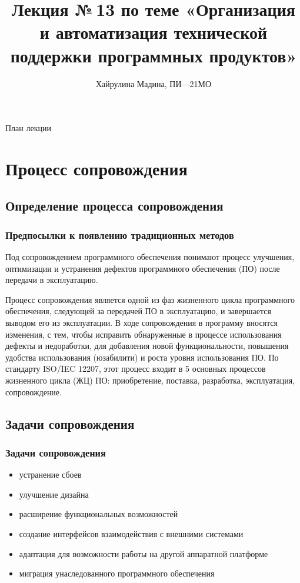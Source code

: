 \documentclass{../industrial-development}
\title{Лекция №\,13 по теме «Организация и автоматизация технической поддержки программных продуктов»}
\author{Хайрулина Мадина, ПИ---21МО}
\date{}
\begin{document}
\begin{frame}
  \titlepage
\end{frame}

\begin{frame}{План лекции}
  \tableofcontents
\end{frame}  

\section{Процесс сопровождения}
\subsection{Определение процесса сопровождения}

\begin{frame} \frametitle{Предпосылки к появлению традиционных методов}
	\begin{itemize}
		\alert{Под сопровождением программного обеспечения} 
		 понимают процесс улучшения, оптимизации и устранения дефектов программного обеспечения (ПО) после передачи в эксплуатацию.
	\end{itemize}
\end{frame}

\lecturenotes
Процесс сопровождения является одной из фаз жизненного цикла программного обеспечения, следующей за передачей ПО в эксплуатацию, и завершается выводом его из эксплуатации. В ходе сопровождения в программу вносятся изменения, с тем, чтобы исправить обнаруженные в процессе использования дефекты и недоработки, для добавления новой функциональности, повышения удобства использования (юзабилити) и роста уровня использования ПО. По стандарту ISO/IEC 12207, этот процесс входит в 5 основных процессов жизненного цикла (ЖЦ) ПО: приобретение, поставка, разработка, эксплуатация, сопровождение. 


\subsection{Задачи сопровождения}
\begin{frame} \frametitle{Задачи сопровождения}
	\begin{itemize}
		\item устранение сбоев
		\item улучшение дизайна 
		\item расширение функциональных возможностей 
		\item создание интерфейсов взаимодействия с внешними системами 
		\item адаптация для возможности работы на другой аппаратной платформе
		\item миграция унаследованного программного обеспечения
	\end{itemize}
\end{frame}
\end{document}
